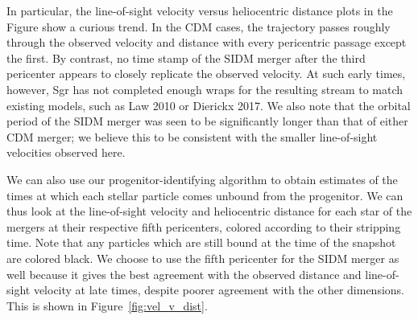 In particular, the line-of-sight velocity versus heliocentric distance plots
in the Figure show a curious trend.  In the CDM cases, the trajectory passes
roughly through the observed velocity and distance with every pericentric
passage except the first.  By contrast, no time stamp of the SIDM merger after
the third pericenter appears to closely replicate the observed velocity.  At
such early times, however, Sgr has not completed enough wraps for the resulting
stream to match existing models, such as Law 2010 or Dierickx 2017.  We also
note that the orbital period of the SIDM merger was seen to be significantly
longer than that of either CDM merger; we believe this to be consistent with
the smaller line-of-sight velocities observed here.

We can also use our progenitor-identifying algorithm to obtain estimates of the
times at which each stellar particle comes unbound from the progenitor. We can
thus look at the line-of-sight velocity and heliocentric distance for each star
of the mergers at their respective fifth pericenters, colored according to their
stripping time.  Note that any particles which are still bound at the time of
the snapshot are colored black.  We choose to use the fifth pericenter for the
SIDM merger as well because it gives the best agreement with the observed
distance and line-of-sight velocity at late times, despite poorer agreement
with the other dimensions.  This is shown in Figure~\ref{fig:vel_v_dist}.

